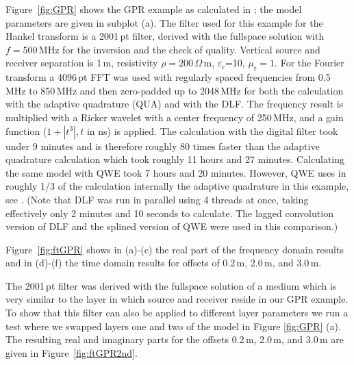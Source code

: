 \documentclass[paper,twocolumn,twoside]{geophysics}
\newcommand{\mr}[1]{\mathrm{#1}}
\begin{document}
Figure~\ref{fig:GPR} shows the GPR example as calculated in
\cite{GEO.15.Hunziker, GEO.17.Werthmuller}; the model parameters are given in
subplot (a). The filter used for this example for the Hankel transform is a
2001\,pt filter, derived with the fullspace solution with $f=500\,$MHz for the
inversion and the check of quality. Vertical source and receiver separation is
1\,m, resistivity $\rho=200\,\Omega\,$m, $\varepsilon_\mr{r}$=10,
$\mu_\mr{r}=1$. For the Fourier transform a 4096\,pt FFT was used with
regularly spaced frequencies from 0.5\,MHz to 850\,MHz and then zero-padded up
to 2048\,MHz for both the calculation with the adaptive quadrature (QUA) and
with the DLF. The frequency result is multiplied with a Ricker wavelet with a
center frequency of 250\,MHz, and a gain function ($1 + |t^3|, t$ in ns) is
applied. The calculation with the digital filter took under 9 minutes and is
therefore roughly 80 times faster than the adaptive quadrature calculation
which took roughly 11 hours and 27 minutes. Calculating the same model with QWE
took 7 hours and 20 minutes. However, QWE uses in roughly 1/3 of the
calculation internally the adaptive quadrature in this example, see
\cite{GEO.17.Werthmuller}. (Note that DLF was run in parallel using 4 threads
at once, taking effectively only 2 minutes and 10 seconds to calculate.
The lagged convolution version of DLF and the splined version of QWE were used
in this comparison.)
%
%

Figure~\ref{fig:ftGPR} shows in (a)-(c) the real part of the frequency domain
results and in (d)-(f) the time domain results for offsets of 0.2\,m, 2.0\,m,
and 3.0\,m.
%
%

The 2001\,pt filter was derived with the fullspace solution of a medium which
is very similar to the layer in which source and receiver reside in our GPR
example. To show that this filter can also be applied to different layer
parameters we run a test where we swapped layers one and two of the model
in Figure \ref{fig:GPR} (a). The resulting real and imaginary parts for the
offsets 0.2\,m, 2.0\,m, and 3.0\,m are given in Figure~\ref{fig:ftGPR2nd}.
\end{document}
